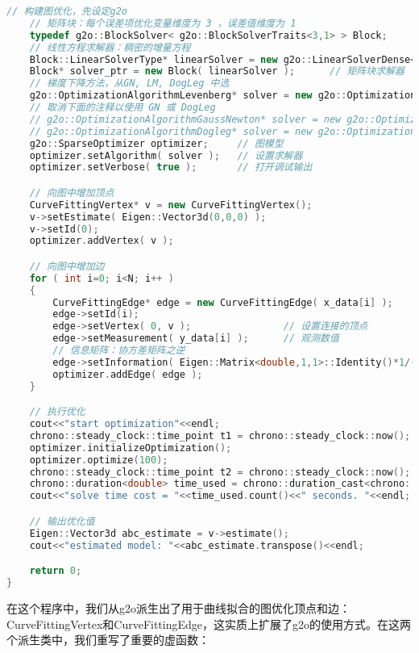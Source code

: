 \begin{lstlisting}[language=c++,caption=slambook/ch6/g2o\_curve\_fitting/main.cpp]
	// 构建图优化，先设定g2o
	// 矩阵块：每个误差项优化变量维度为 3 ，误差值维度为 1
	typedef g2o::BlockSolver< g2o::BlockSolverTraits<3,1> > Block; 
	// 线性方程求解器：稠密的增量方程
	Block::LinearSolverType* linearSolver = new g2o::LinearSolverDense<Block::PoseMatrixType>();
	Block* solver_ptr = new Block( linearSolver );      // 矩阵块求解器
	// 梯度下降方法，从GN, LM, DogLeg 中选
	g2o::OptimizationAlgorithmLevenberg* solver = new g2o::OptimizationAlgorithmLevenberg( solver_ptr );
	// 取消下面的注释以使用 GN 或 DogLeg 
	// g2o::OptimizationAlgorithmGaussNewton* solver = new g2o::OptimizationAlgorithmGaussNewton( solver_ptr );
	// g2o::OptimizationAlgorithmDogleg* solver = new g2o::OptimizationAlgorithmDogleg( solver_ptr );
	g2o::SparseOptimizer optimizer;     // 图模型
	optimizer.setAlgorithm( solver );   // 设置求解器
	optimizer.setVerbose( true );       // 打开调试输出

	// 向图中增加顶点
	CurveFittingVertex* v = new CurveFittingVertex();
	v->setEstimate( Eigen::Vector3d(0,0,0) );
	v->setId(0);
	optimizer.addVertex( v );

	// 向图中增加边
	for ( int i=0; i<N; i++ )
	{
		CurveFittingEdge* edge = new CurveFittingEdge( x_data[i] );
		edge->setId(i);
		edge->setVertex( 0, v );                // 设置连接的顶点
		edge->setMeasurement( y_data[i] );      // 观测数值
		// 信息矩阵：协方差矩阵之逆
		edge->setInformation( Eigen::Matrix<double,1,1>::Identity()*1/(w_sigma*w_sigma) ); 
		optimizer.addEdge( edge );
	}

	// 执行优化
	cout<<"start optimization"<<endl;
	chrono::steady_clock::time_point t1 = chrono::steady_clock::now();
	optimizer.initializeOptimization();
	optimizer.optimize(100);
	chrono::steady_clock::time_point t2 = chrono::steady_clock::now();
	chrono::duration<double> time_used = chrono::duration_cast<chrono::duration<double>>( t2-t1 );
	cout<<"solve time cost = "<<time_used.count()<<" seconds. "<<endl;

	// 输出优化值
	Eigen::Vector3d abc_estimate = v->estimate();
	cout<<"estimated model: "<<abc_estimate.transpose()<<endl;

	return 0;
}
\end{lstlisting}

在这个程序中，我们从g2o派生出了用于曲线拟合的图优化顶点和边：CurveFittingVertex和CurveFittingEdge，这实质上扩展了g2o的使用方式。在这两个派生类中，我们重写了重要的虚函数：

